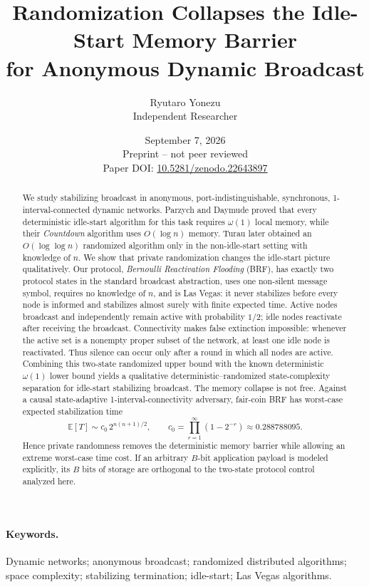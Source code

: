 \documentclass[11pt]{article}
\title{\textbf{Randomization Collapses the Idle-Start Memory Barrier\\for Anonymous Dynamic Broadcast}}
\author{Ryutaro Yonezu\\Independent Researcher}
\date{September 7, 2026\\\small Preprint -- not peer reviewed\\\small Paper DOI: \href{https://doi.org/10.5281/zenodo.22643897}{10.5281/zenodo.22643897}}
\newcommand{\E}{\mathbb{E}}
\newcommand{\BRF}{\textsc{BRF}}
\begin{document}
\maketitle

\begin{abstract}
We study stabilizing broadcast in anonymous, port-indistinguishable, synchronous, 1-interval-connected dynamic networks. Parzych and Daymude proved that every deterministic idle-start algorithm for this task requires $\omega(1)$ local memory, while their \emph{Countdown} algorithm uses $O(\log n)$ memory. Turau later obtained an $O(\log\log n)$ randomized algorithm only in the non-idle-start setting with knowledge of $n$. We show that private randomization changes the idle-start picture qualitatively. Our protocol, \emph{Bernoulli Reactivation Flooding} (\BRF), has exactly two protocol states in the standard broadcast abstraction, uses one non-silent message symbol, requires no knowledge of $n$, and is Las Vegas: it never stabilizes before every node is informed and stabilizes almost surely with finite expected time. Active nodes broadcast and independently remain active with probability $1/2$; idle nodes reactivate after receiving the broadcast. Connectivity makes false extinction impossible: whenever the active set is a nonempty proper subset of the network, at least one idle node is reactivated. Thus silence can occur only after a round in which all nodes are active. Combining this two-state randomized upper bound with the known deterministic $\omega(1)$ lower bound yields a qualitative deterministic--randomized state-complexity separation for idle-start stabilizing broadcast. The memory collapse is not free. Against a causal state-adaptive 1-interval-connectivity adversary, fair-coin \BRF{} has worst-case expected stabilization time
\[
  \E[T] \sim c_0\,2^{n(n+1)/2},
  \qquad
  c_0=\prod_{r=1}^{\infty}(1-2^{-r})\approx 0.288788095.
\]
Hence private randomness removes the deterministic memory barrier while allowing an extreme worst-case time cost. If an arbitrary $B$-bit application payload is modeled explicitly, its $B$ bits of storage are orthogonal to the two-state protocol control analyzed here.
\end{abstract}

\paragraph{Keywords.}
Dynamic networks; anonymous broadcast; randomized distributed algorithms; space complexity; stabilizing termination; idle-start; Las Vegas algorithms.
\end{document}
